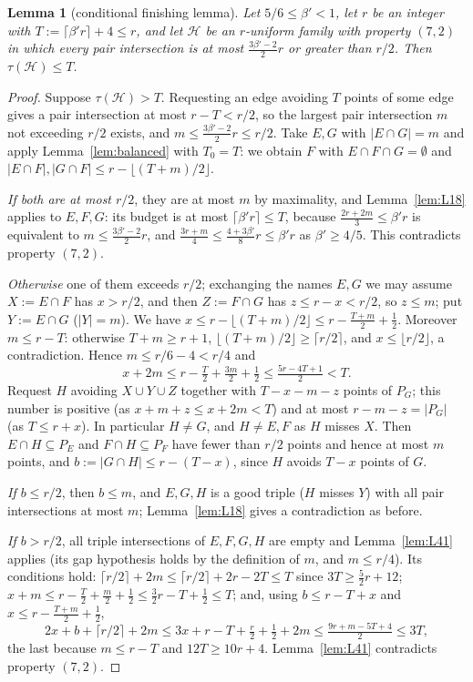 \documentclass[11pt]{amsart}
\newtheorem{lemma}[theorem]{Lemma}
\theoremstyle{definition}
\theoremstyle{remark}
\newcommand{\cH}{\mathcal H}
\newcommand{\ceil}[1]{\lceil #1\rceil}
\newcommand{\floor}[1]{\lfloor #1\rfloor}
\begin{document}
\begin{lemma}[conditional finishing lemma]\label{lem:finish}
Let $5/6\le\beta'<1$, let $r$ be an integer with $T:=\ceil{\beta' r}+4\le r$, and let $\cH$ be an $r$-uniform family with property $(7,2)$ in which every pair intersection is at most $\tfrac{3\beta'-2}{2}r$ or greater than $r/2$. Then $\tau(\cH)\le T$.
\end{lemma}
\begin{proof}
Suppose $\tau(\cH)>T$. Requesting an edge avoiding $T$ points of some edge gives a pair intersection at most $r-T<r/2$, so the largest pair intersection $m$ not exceeding $r/2$ exists, and $m\le\tfrac{3\beta'-2}{2}r\le r/2$. Take $E,G$ with $|E\cap G|=m$ and apply Lemma~\ref{lem:balanced} with $T_0=T$: we obtain $F$ with $E\cap F\cap G=\emptyset$ and $|E\cap F|,|G\cap F|\le r-\floor{(T+m)/2}$.

\emph{If both are at most $r/2$}, they are at most $m$ by maximality, and Lemma~\ref{lem:L18} applies to $E,F,G$: its budget is at most $\ceil{\beta' r}\le T$, because $\tfrac{2r+2m}{3}\le\beta' r$ is equivalent to $m\le\tfrac{3\beta'-2}{2}r$, and $\tfrac{3r+m}{4}\le\tfrac{4+3\beta'}{8}r\le\beta' r$ as $\beta'\ge4/5$. This contradicts property $(7,2)$.

\emph{Otherwise} one of them exceeds $r/2$; exchanging the names $E,G$ we may assume $X:=E\cap F$ has $x>r/2$, and then $Z:=F\cap G$ has $z\le r-x<r/2$, so $z\le m$; put $Y:=E\cap G$ ($|Y|=m$). We have $x\le r-\floor{(T+m)/2}\le r-\tfrac{T+m}{2}+\tfrac12$. Moreover $m\le r-T$: otherwise $T+m\ge r+1$, $\floor{(T+m)/2}\ge\ceil{r/2}$, and $x\le\floor{r/2}$, a contradiction. Hence $m\le r/6-4<r/4$ and
\[
x+2m\le r-\tfrac T2+\tfrac{3m}{2}+\tfrac12\le\tfrac{5r-4T+1}{2}<T .
\]
Request $H$ avoiding $X\cup Y\cup Z$ together with $T-x-m-z$ points of $P_G$; this number is positive (as $x+m+z\le x+2m<T$) and at most $r-m-z=|P_G|$ (as $T\le r+x$). In particular $H\ne G$, and $H\ne E,F$ as $H$ misses $X$. Then $E\cap H\subseteq P_E$ and $F\cap H\subseteq P_F$ have fewer than $r/2$ points and hence at most $m$ points, and $b:=|G\cap H|\le r-(T-x)$, since $H$ avoids $T-x$ points of $G$.

\emph{If $b\le r/2$}, then $b\le m$, and $E,G,H$ is a good triple ($H$ misses $Y$) with all pair intersections at most $m$; Lemma~\ref{lem:L18} gives a contradiction as before.

\emph{If $b>r/2$}, all triple intersections of $E,F,G,H$ are empty and Lemma~\ref{lem:L41} applies (its gap hypothesis holds by the definition of $m$, and $m\le r/4$). Its conditions hold: $\ceil{r/2}+2m\le\ceil{r/2}+2r-2T\le T$ since $3T\ge\tfrac52r+12$; $x+m\le r-\tfrac T2+\tfrac m2+\tfrac12\le\tfrac32r-T+\tfrac12\le T$; and, using $b\le r-T+x$ and $x\le r-\tfrac{T+m}{2}+\tfrac12$,
\[
2x+b+\ceil{r/2}+2m\le 3x+r-T+\tfrac r2+\tfrac12+2m\le\tfrac{9r+m-5T+4}{2}\le3T,
\]
the last because $m\le r-T$ and $12T\ge10r+4$. Lemma~\ref{lem:L41} contradicts property $(7,2)$.
\end{proof}
\end{document}
